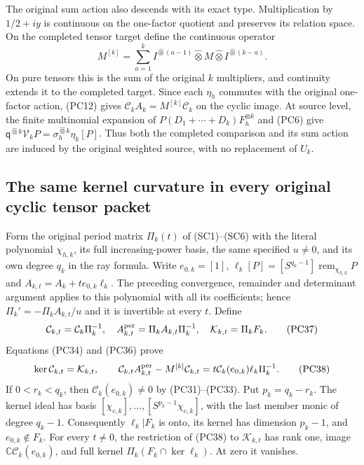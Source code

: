 \documentclass{article}
\begin{document}
The original sum action also descends with its exact type.  Multiplication
by $1/2+iy$ is continuous on the one-factor quotient and preserves its
relation space.  On the completed tensor target define the continuous
operator
\[
 M^{[k]}=\sum_{a=1}^k
       I^{\widehat\otimes(a-1)}\widehat\otimes M
                         \widehat\otimes I^{\widehat\otimes(k-a)}.
 \tag{PC36}
\]
On pure tensors this is the sum of the original $k$ multipliers,
and continuity extends it to the completed target.  Since each
$\eta_h$ commutes with the original one-factor action, (PC12)
gives $\mathcal C_kA_k=M^{[k]}\mathcal C_k$ on the cyclic image.
At source level, the finite multinomial expansion of
$P(D_1+\cdots+D_k)F_h^{\otimes k}$ and (PC6) give
$\mathsf q^{\widehat\otimes k}\mathcal V_kP
=\sigma_h^{\widehat\otimes k}\eta_k[P]$.
Thus both the completed comparison and its sum action are induced
by the original weighted source, with no replacement of $U_k$.

\subsection{The same kernel curvature in every original cyclic tensor packet}

Form the original period matrix $\Pi_k(t)$ of (SC1)--(SC6) with
the literal polynomial $\chi_{h,k}$, its full increasing-power basis,
the same specified $u\ne0$, and its own degree $q_k$ in the ray
formula.  Write $e_{0,k}=[1]$,
$\ell_k[P]=[S^{q_k-1}]\operatorname{rem}_{\chi_{h,k}}P$ and
$A_{k,t}=A_k+t e_{0,k}\ell_k$.  The preceding convergence,
remainder and determinant argument applies to this polynomial with
all its coefficients; hence $\Pi_k'=-\Pi_kA_{k,t}/u$ and it is
invertible at every $t$.  Define
\[
 \mathcal C_{k,t}=\mathcal C_k\Pi_k^{-1},\quad
 A_{k,t}^{\rm per}=\Pi_kA_{k,t}\Pi_k^{-1},\quad
 \mathcal K_{k,t}=\Pi_k F_k.
 \tag{PC37}
\]
Equations (PC34) and (PC36) prove
\[
 \ker\mathcal C_{k,t}=\mathcal K_{k,t},\qquad
 \mathcal C_{k,t}A_{k,t}^{\rm per}-M^{[k]}\mathcal C_{k,t}
       =t\mathcal C_k(e_{0,k})\ell_k\Pi_k^{-1}.
 \tag{PC38}
\]
If $0<r_k<q_k$, then $\mathcal C_k(e_{0,k})\ne0$ by
(PC31)--(PC33).  Put $p_k=q_k-r_k$.  The kernel ideal has basis
$[\chi_{c,k}],\ldots,[S^{p_k-1}\chi_{c,k}]$, with the last
member monic of degree $q_k-1$.  Consequently $\ell_k|F_k$ is
onto, its kernel has dimension $p_k-1$, and $e_{0,k}\notin F_k$.
For every $t\ne0$, the restriction of (PC38) to $\mathcal K_{k,t}$
has rank one, image $\mathbb C\mathcal C_k(e_{0,k})$, and full
kernel $\Pi_k(F_k\cap\ker\ell_k)$.  At zero it vanishes.
\end{document}
